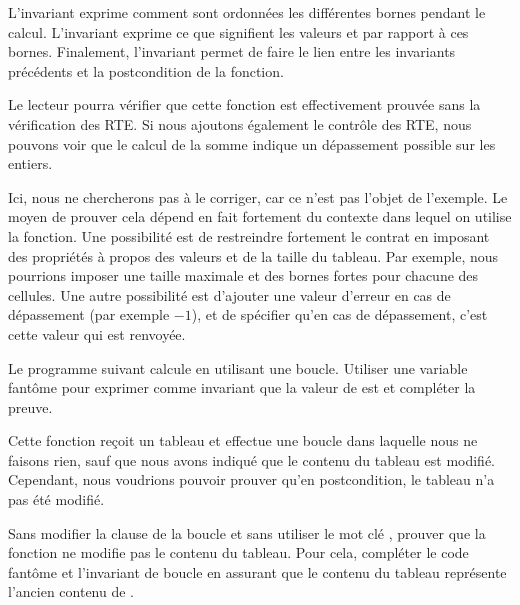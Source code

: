 L'invariant  exprime comment sont ordonnées les différentes bornes
pendant le calcul. L'invariant  exprime ce que signifient les
valeurs  et  par rapport à ces bornes. Finalement,
l'invariant  permet de faire le lien entre les invariants précédents
et la postcondition de la fonction.



Le lecteur pourra vérifier que cette fonction est effectivement prouvée sans la
vérification des RTE. Si nous ajoutons également le contrôle des RTE, nous pouvons
voir que le calcul de la somme indique un dépassement possible sur les entiers.



Ici, nous ne chercherons pas à le corriger, car ce n'est pas l'objet de l'exemple.
Le moyen de prouver cela dépend en fait fortement du contexte dans lequel on
utilise la fonction. Une possibilité est de restreindre fortement le contrat en
imposant des propriétés à propos des valeurs et de la taille du tableau. Par
exemple, nous pourrions imposer une taille maximale et des bornes fortes pour
chacune des cellules. Une autre possibilité est d'ajouter une valeur d'erreur
en cas de dépassement (par exemple $-1$), et de spécifier qu'en cas de
dépassement, c'est cette valeur qui est renvoyée.







Le programme suivant calcule  en utilisant une boucle.
Utiliser une variable fantôme  pour exprimer comme invariant que
la valeur de  est  et compléter la preuve.






Cette fonction reçoit un tableau et effectue une boucle dans laquelle nous ne
faisons rien, sauf que nous avons indiqué que le contenu du tableau est modifié.
Cependant, nous voudrions pouvoir prouver qu'en postcondition, le tableau n'a
pas été modifié.




Sans modifier la clause  de la boucle et sans utiliser le mot
clé , prouver que la fonction ne modifie pas le
contenu du tableau. Pour cela, compléter le code fantôme et l'invariant de boucle
en assurant que le contenu du tableau  représente l'ancien contenu
de .

